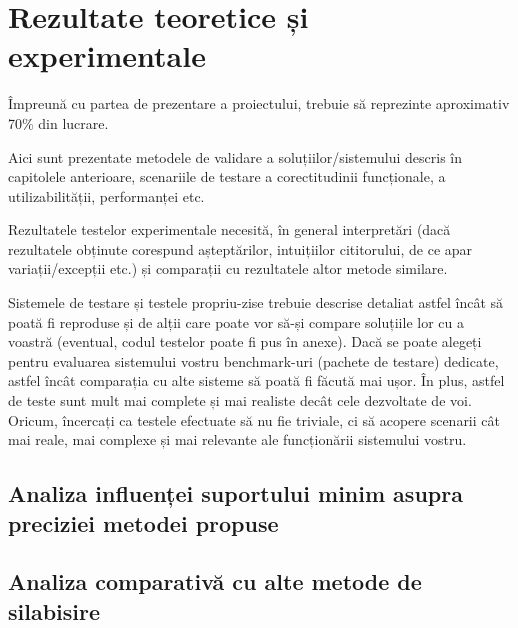 \chapter{Rezultate teoretice și experimentale}
\label{cap:rezultate}

Împreună cu partea de prezentare a proiectului, trebuie să reprezinte aproximativ 70\% din lucrare. 

Aici sunt prezentate metodele de validare a soluțiilor/sistemului descris în capitolele anterioare, scenariile de testare a corectitudinii funcționale, a utilizabilității, performanței etc.   

Rezultatele testelor experimentale necesită, în general interpretări (dacă rezultatele obținute corespund așteptărilor, intuițiilor cititorului, de ce apar variații/excepții etc.) și comparații cu rezultatele altor metode similare. 

Sistemele de testare și testele propriu-zise trebuie descrise detaliat astfel încât să poată fi reproduse și de alții care poate vor să-și compare soluțiile lor cu a voastră (eventual, codul testelor poate fi pus în anexe). Dacă se poate alegeți pentru evaluarea sistemului vostru benchmark-uri (pachete de testare) dedicate, astfel încât comparația cu alte sisteme să poată fi făcută mai ușor. În plus, astfel de teste sunt mult mai complete și mai realiste decât cele dezvoltate de voi. Oricum, încercați ca testele efectuate să nu fie triviale, ci să acopere scenarii cât mai reale, mai complexe și mai relevante ale funcționării sistemului vostru. 

\section{Analiza influenței suportului minim asupra preciziei metodei propuse}

\section{Analiza comparativă cu alte metode de silabisire}